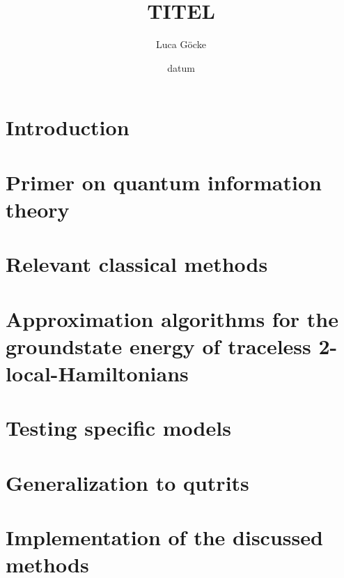 \documentclass[pstricks,siunitx,theorem,british]{tumphthesis}
\title{TITEL}
\author{Luca Göcke}
\date{datum}
\begin{document}
\frontmatter
\maketitle
\tableofcontents
\mainmatter
\chapter{Introduction}

\chapter{Primer on quantum information theory}

\chapter{Relevant classical methods}

\chapter{Approximation algorithms for the groundstate energy of traceless 2-local-Hamiltonians}

\chapter{Testing specific models}

\chapter{Generalization to qutrits}

\appendix
\chapter{Implementation of the discussed methods}

\backmatter
\printbibliography
\end{document}
